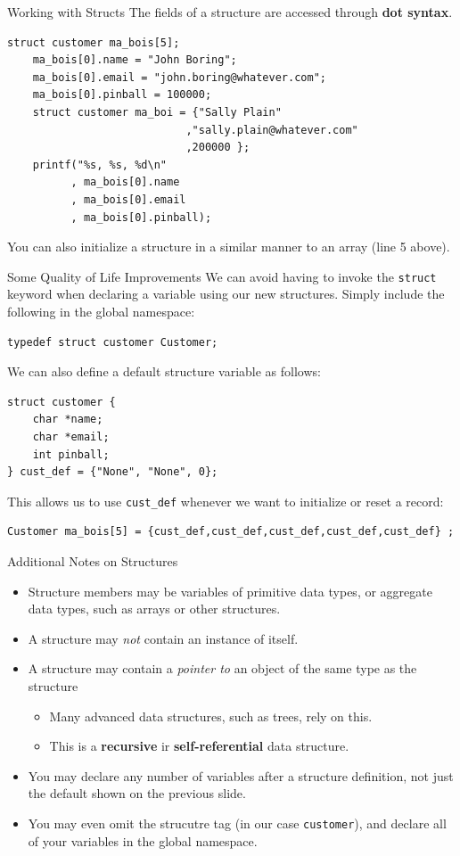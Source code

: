 \documentclass[11pt]{beamer}
\begin{document}
\begin{frame}[fragile=singleslide]{Working with Structs}
The fields of a structure are accessed through \textbf{dot syntax}.
\begin{lstlisting}[style=C]
	struct customer ma_bois[5];
	ma_bois[0].name = "John Boring";
	ma_bois[0].email = "john.boring@whatever.com";
	ma_bois[0].pinball = 100000;
	struct customer ma_boi = {"Sally Plain"
							,"sally.plain@whatever.com"
							,200000 };
	printf("%s, %s, %d\n"
	      , ma_bois[0].name
	      , ma_bois[0].email
	      , ma_bois[0].pinball);
\end{lstlisting}
You can also initialize a structure in a similar manner to an array (line 5 above).
\end{frame}

\begin{frame}[fragile=singleslide]{Some Quality of Life Improvements}
We can avoid having to invoke the \texttt{struct} keyword when declaring a variable using our new structures.  Simply include the following in the global namespace:
\begin{lstlisting}[style=C]
typedef struct customer Customer;
\end{lstlisting}
We can also define a default structure variable as follows:
\begin{lstlisting}[style=C]
struct customer {
	char *name;
	char *email;
	int pinball;
} cust_def = {"None", "None", 0};
\end{lstlisting}
This allows us to use \texttt{cust\_def} whenever we want to initialize or reset a record:
\begin{lstlisting}[style=C]
	Customer ma_bois[5] = {cust_def,cust_def,cust_def,cust_def,cust_def} ;
\end{lstlisting}
\end{frame}

\begin{frame}{Additional Notes on Structures}
\begin{itemize}
\item Structure members may be variables of primitive data types, or aggregate data types, such as arrays or other structures.
\item A structure may \emph{not} contain an instance of itself.
\item A structure may contain a \emph{pointer to} an object of the same type as the structure
\begin{itemize}
\item Many advanced data structures, such as trees, rely on this.
\item This is a \textbf{recursive} ir \textbf{self-referential} data structure.
\end{itemize}
\item You may declare any number of variables after a structure definition, not just the default shown on the previous slide. 
\item You may even omit the strucutre tag (in our case \texttt{customer}), and declare all of your variables in the global namespace.  
\end{itemize}
\end{frame}
\end{document}
